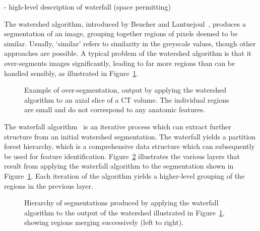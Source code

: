 \documentclass{jfp}
\begin{document}
 - high-level description of waterfall (space permitting)



The watershed algorithm, introduced by Beucher and
Lantuejoul~\cite{beucher79}, produces a segmentation of an image,
grouping together regions of pixels deemed to be similar. Usually,
`similar' refers to similarity in the greyscale values, though other
approaches are possible. A typical problem of the watershed algorithm
is that it over-segments images significantly, leading to far more
regions than can be handled sensibly, as illustrated in
Figure~\ref{fig:oversegmented}.

\begin{figure}
\centering
\ifpdf
        \hspace{1mm}%
\else
\fi
\caption{Example of over-segmentation, output by applying the watershed
  algorithm to an axial slice of a CT volume. The individual regions
  are small and do not correspond to any anatomic features.}
\label{fig:oversegmented}
\end{figure}
%
The waterfall algorithm~\cite{beucher94,marcotegui} is an iterative process which can extract
further structure from an initial watershed segmentation. The
waterfall yields a partition forest hierarchy, which is a
comprehensive data structure which  can subsequently be used  for
feature identification.  Figure~\ref{fig:waterfall} illustrates the
various layers that result from applying the waterfall algorithm to
the segmentation shown in Figure~\ref{fig:oversegmented}.  Each
iteration of the algorithm yields a higher-level grouping of the
regions in the previous layer.
\begin{figure}
\centering
\ifpdf
        \hspace{1mm}%
        \hspace{1mm}%
\else
\fi
\caption{Hierarchy of segmentations produced by applying the waterfall
  algorithm to the output of the watershed illustrated in
  Figure~\ref{fig:oversegmented}, showing regions merging successively
  (left to right).}
\label{fig:waterfall}
\end{figure}
\end{document}
